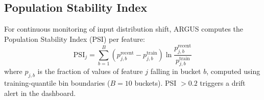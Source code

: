 \subsection{Population Stability Index}

For continuous monitoring of input distribution shift, ARGUS computes
the Population Stability Index (PSI) per feature:
\begin{equation}
    \text{PSI}_j = \sum_{b=1}^{B}
    \left(p_{j,b}^{\text{recent}} - p_{j,b}^{\text{train}}\right)
    \ln\!\frac{p_{j,b}^{\text{recent}}}{p_{j,b}^{\text{train}}}
\end{equation}
where $p_{j,b}$ is the fraction of values of feature $j$ falling in bucket $b$,
computed using training-quantile bin boundaries ($B=10$ buckets).
PSI $> 0.2$ triggers a drift alert in the dashboard.
